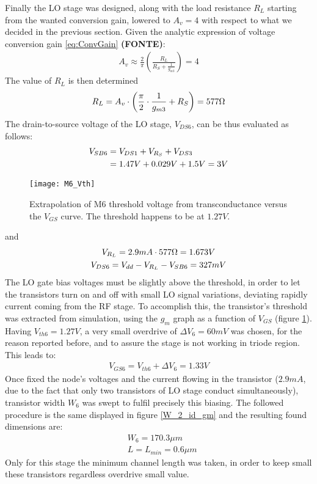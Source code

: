 Finally the LO stage was designed, along with the load resistance \(R_L\) starting from the wanted conversion gain, lowered to  \(A_v=4\) with respect to what we decided in the previous section. Given the analytic expression of voltage conversion gain \ref{eq:ConvGain} \textbf{(FONTE)}:
\begin{align}
	A_v \approx \frac{2}{\pi}\left( \frac{R_L}{R_S + \frac{1}{g_{m3}}}\right)=4 \nonumber
\end{align}
The value of \(R_L\) is then determined
\begin{align}
	R_L=A_v \cdot \left( \frac{\pi}{2} \cdot\frac{1}{g_{m3}} + R_S \right)=577 \ohm
\end{align}
The drain-to-source voltage of the LO stage, \(V_{DS6}\), can be thus evaluated as follows:
\begin{align}
	V_{SB6}&=V_{DS1}+V_{R_S}+V_{DS3} \notag\\
	&= 1.47V+0.029V+1.5V=3V \nonumber
\end{align}
\begin{figure}[H]
	\centering
	\texttt{[image: M6\_Vth]}
	\caption{Extrapolation of M6 threshold voltage from transconductance versus the \(V_{GS}\) curve. The threshold happens to be at \(1.27V\).}
	\label{M6_Vth}
\end{figure}
and 
\begin{gather}	
	V_{R_L}=2.9mA\cdot 577\ohm=1.673V \nonumber \\
	V_{DS6}=V_{dd}-V_{R_L}-V_{SB6}=327mV \nonumber
\end{gather}
The LO gate bias voltages must be slightly above the threshold, in order to let the transistors turn on and off with small LO signal variations, deviating rapidly current coming from the RF stage. To accomplish this, the transistor's threshold was extracted from simulation, using the \(g_{m}\) graph as a function of \(V_{GS}\) (figure \ref{M6_Vth}). 
Having \(V_{th6}=1.27V\), a very small overdrive of \( \Delta V_6=60mV \) was chosen, for the reason reported before, and to assure the stage is not working in triode region. This leads to:
\begin{align}
	V_{GS6}=V_{th6}+\Delta V_6=1.33V \nonumber
\end{align}
Once fixed the node's voltages and the current flowing in the transistor (\(2.9mA\), due to the fact that only two transistors of LO stage conduct simultaneously), transistor width \(W_6\) was swept to fulfil precisely this biasing. The followed procedure is the same displayed in figure \ref{W_2_id_gm} and the resulting found dimensions are:
\begin{align}
	&W_6=170.3\mu m \nonumber\\
	&L = L_{min} = 0.6\mu m \nonumber
\end{align}                                                                      
Only for this stage the minimum channel length was taken, in order to keep small these transistors regardless overdrive small value.

